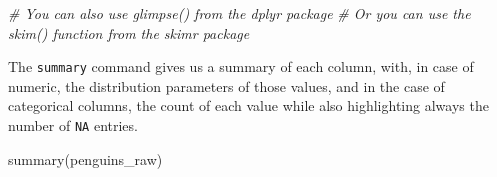 \documentclass[
]{book}
\newenvironment{Shaded}{\begin{snugshade}}{\end{snugshade}}
\newcommand{\CommentTok}[1]{\textcolor[rgb]{0.56,0.35,0.01}{\textit{#1}}}
\newcommand{\FunctionTok}[1]{\textcolor[rgb]{0.00,0.00,0.00}{#1}}
\newcommand{\NormalTok}[1]{#1}
\begin{document}
\begin{Shaded}
\begin{Highlighting}[]
\CommentTok{\# You can also use glimpse() from the dplyr package}
\CommentTok{\# Or you can use the skim() function from the skimr package}
\end{Highlighting}
\end{Shaded}

The \texttt{summary} command gives us a summary of each column, with, in case of numeric, the distribution parameters of those values, and in the case of categorical columns, the count of each value while also highlighting always the number of \texttt{NA} entries.

\begin{Shaded}
\begin{Highlighting}[]
\FunctionTok{summary}\NormalTok{(penguins\_raw)}
\end{Highlighting}
\end{Shaded}
\end{document}
